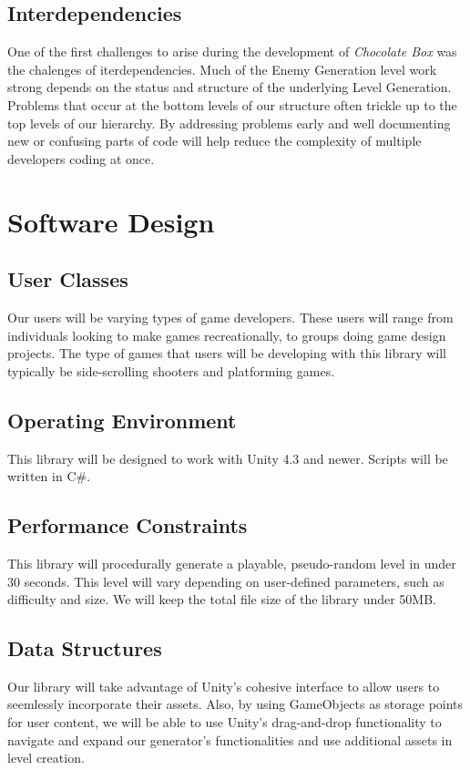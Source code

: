 \documentclass[pdftex,12pt,letter]{article}
\begin{document}
\begin{itemize}
\begin{itemize}
\begin{itemize}
\subsection{Interdependencies}
One of the first challenges to arise during the development of \textit{Chocolate Box} was the chalenges of iterdependencies. Much of the Enemy Generation level work strong depends on the status and structure of the underlying Level Generation. Problems that occur at the bottom levels of our structure often trickle up to the top levels of our hierarchy. By addressing problems early and well documenting new or confusing parts of code will help reduce the complexity of multiple developers coding at once. 


\section{Software Design}
\subsection{User Classes}
Our users will be varying types of game developers. These users will range from individuals looking to make games recreationally, to groups doing game design projects. The type of games that users will be developing with this library will typically be side-scrolling shooters and platforming games.
\subsection{Operating Environment}
This library will be designed to work with Unity 4.3 and newer. Scripts will be written in C\#.
\subsection{Performance Constraints}
This library will procedurally generate a playable, pseudo-random level in under 30 seconds. This level will vary depending on user-defined parameters, such as difficulty and size. We will keep the total file size of the library under 50MB.
\subsection{Data Structures}
Our library will take advantage of Unity's cohesive interface to allow users to seemlessly incorporate their assets.  Also, by using GameObjects as storage points for user content, we will be able to use Unity's drag-and-drop functionality to navigate and expand our generator's functionalities and use additional assets in level creation.

\end{itemize}
\end{itemize}
\end{itemize}
\end{document}

